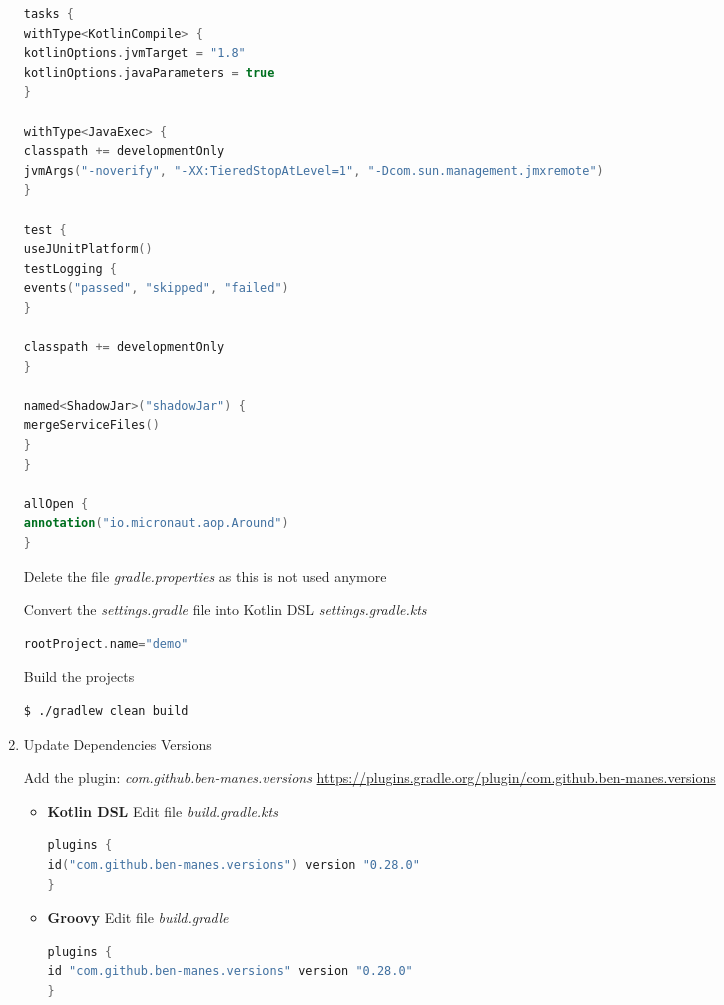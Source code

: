 \documentclass[12pt, letterpaper]{article}
\begin{document}
\begin{enumerate}
{\begin{lstlisting}[language=Kotlin]
tasks {
withType<KotlinCompile> {
kotlinOptions.jvmTarget = "1.8"
kotlinOptions.javaParameters = true
}

withType<JavaExec> {
classpath += developmentOnly
jvmArgs("-noverify", "-XX:TieredStopAtLevel=1", "-Dcom.sun.management.jmxremote")
}

test {
useJUnitPlatform()
testLogging {
events("passed", "skipped", "failed")
}

classpath += developmentOnly
}

named<ShadowJar>("shadowJar") {
mergeServiceFiles()
}
}

allOpen {
annotation("io.micronaut.aop.Around")
}
\end{lstlisting}

Delete the file \textit{gradle.properties} as this is not used anymore

Convert the \textit{settings.gradle} file into Kotlin DSL \textit{settings.gradle.kts}

\begin{lstlisting}[language=Kotlin]
rootProject.name="demo"
\end{lstlisting}

Build the projects
\begin{lstlisting}[language=bash]
$ ./gradlew clean build
\end{lstlisting}
}

\item { Update Dependencies Versions

Add the plugin: \textit{com.github.ben-manes.versions}
\newline
{\footnotesize \url{https://plugins.gradle.org/plugin/com.github.ben-manes.versions}}

\begin{itemize}
\item[] {

\textbf{Kotlin DSL}
\newline
Edit file \textit{build.gradle.kts}

\begin{lstlisting}[language=Kotlin]
plugins {
id("com.github.ben-manes.versions") version "0.28.0"
}
\end{lstlisting}
}
\item[]{

\textbf{Groovy}
\newline
Edit file \textit{build.gradle}

\begin{lstlisting}[language=Groovy]
plugins {
id "com.github.ben-manes.versions" version "0.28.0"
}
\end{lstlisting}
}
\end{itemize}

}
\end{enumerate}
\end{document}
